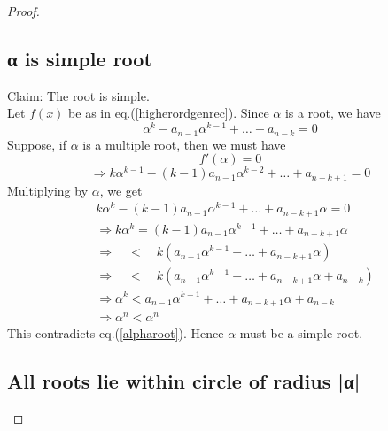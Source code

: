 \begin{multicols}{2}
\begin{proof}
\subsection{{\greekfont α} is simple root}\label{subsection-11.1}

\vspace{-.2cm}

Claim: The root is simple. \\
Let $f(x)$ be as in eq.(\ref{higherordgenrec}). Since $\alpha$ is a root, we have
 \begin{equation}
\alpha^k - a_{n-1}\alpha^{k-1} + \ldots + a_{n-k} = 0\label{eq-11.3}
 \end{equation}
Suppose, if $\alpha$ is a multiple root, then we must have
\begin{equation}
 f'(\alpha) = 0 \label{eq-11.4}
\end{equation}
\begin{equation}
\Rightarrow k\alpha^{k-1}-(k-1)a_{n-1}\alpha^{k-2} + \ldots + a_{n-k+1} = 0 \label{eq-11.5}
\end{equation}
Multiplying by $\alpha$, we get
\begin{align}
 &k\alpha^{k} - (k-1)a_{n-1}\alpha^{k-1} + \ldots + a_{n-k+1}\alpha = 0\nonumber\\
 &\Rightarrow  k\alpha^{k} = (k-1)a_{n-1}\alpha^{k-1} + \ldots + a_{n-k+1}\alpha\nonumber\\
 &\Rightarrow  \quad<\quad k\left( a_{n-1}\alpha^{k-1} + \ldots +a_{n-k+1}\alpha \right)\nonumber\\
 &\Rightarrow  \quad< \quad k\left( a_{n-1}\alpha^{k-1} + \ldots +a_{n-k+1}\alpha + a_{n-k}\right)\nonumber\\
 &\Rightarrow \alpha^{k} <  a_{n-1}\alpha^{k-1} + \ldots + a_{n-k+1}\alpha + a_{n-k}\nonumber\\
 &\Rightarrow\alpha^{n} < \alpha^{n} \nonumber
\end{align}
This contradicts eq.(\ref{alpharoot}). Hence $\alpha$ must be a simple root.

\subsection{All roots lie within circle of radius |{\greekfont α}|}\label{subsection-11.2}


\end{proof}
\end{multicols}
